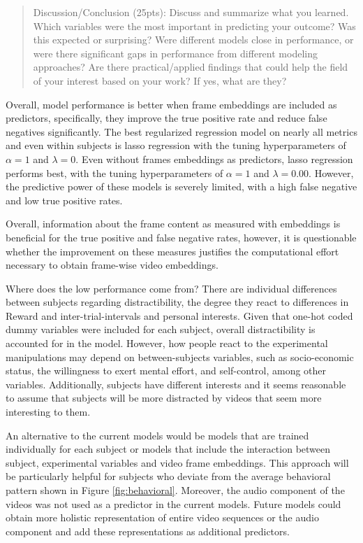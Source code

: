 \documentclass[
  man,floatsintext]{apa6}
\begin{document}
\begin{quote}
Discussion/Conclusion (25pts): Discuss and summarize what you learned. Which variables were the most important in predicting your outcome? Was this expected or surprising? Were different models close in performance, or were there significant gaps in performance from different modeling approaches? Are there practical/applied findings that could help the field of your interest based on your work? If yes, what are they?
\end{quote}

Overall, model performance is better when frame embeddings are included as predictors, specifically, they improve the true positive rate and reduce false negatives significantly. The best regularized regression model on nearly all metrics and even within subjects is lasso regression with the tuning hyperparameters of \(\alpha = 1\) and \(\lambda = 0\). Even without frames embeddings as predictors, lasso regression performs best, with the tuning hyperparameters of \(\alpha = 1\) and \(\lambda = 0.00\). However, the predictive power of these models is severely limited, with a high false negative and low true positive rates.

Overall, information about the frame content as measured with embeddings is beneficial for the true positive and false negative rates, however, it is questionable whether the improvement on these measures justifies the computational effort necessary to obtain frame-wise video embeddings.

Where does the low performance come from? There are individual differences between subjects regarding distractibility, the degree they react to differences in Reward and inter-trial-intervals and personal interests. Given that one-hot coded dummy variables were included for each subject, overall distractibility is accounted for in the model. However, how people react to the experimental manipulations may depend on between-subjects variables, such as socio-economic status, the willingness to exert mental effort, and self-control, among other variables. Additionally, subjects have different interests and it seems reasonable to assume that subjects will be more distracted by videos that seem more interesting to them.

An alternative to the current models would be models that are trained individually for each subject or models that include the interaction between subject, experimental variables and video frame embeddings. This approach will be particularly helpful for subjects who deviate from the average behavioral pattern shown in Figure \ref{fig:behavioral}. Moreover, the audio component of the videos was not used as a predictor in the current models. Future models could obtain more holistic representation of entire video sequences or the audio component and add these representations as additional predictors.
\end{document}
